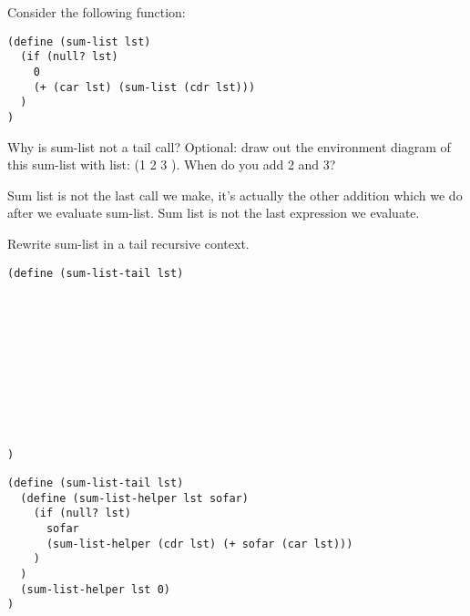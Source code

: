 \begin{blocksection}
\question Consider the following function:

\begin{lstlisting}
(define (sum-list lst)
  (if (null? lst)
    0
    (+ (car lst) (sum-list (cdr lst)))
  )
)
\end{lstlisting}

\vspace{2\baselineskip}

Why is sum-list not a tail call? Optional: draw out the environment diagram of this sum-list with list: (1 2 3
). When do you add 2 and 3?

\begin{solution}[0.5in]
Sum list is not the last call we make, it's actually the other addition which we do after we evaluate sum-list.
Sum list is not the last expression we evaluate.
\end{solution}
\end{blocksection}

\newpage

\begin{blocksection}
\question Rewrite sum-list in a tail recursive context.

\begin{lstlisting}
(define (sum-list-tail lst)











)
\end{lstlisting}

\begin{solution}[0.5in]
\begin{lstlisting}
(define (sum-list-tail lst)
  (define (sum-list-helper lst sofar)
    (if (null? lst)
      sofar
      (sum-list-helper (cdr lst) (+ sofar (car lst)))
    )
  )
  (sum-list-helper lst 0)
)
\end{lstlisting}
\end{solution}

\end{blocksection}
